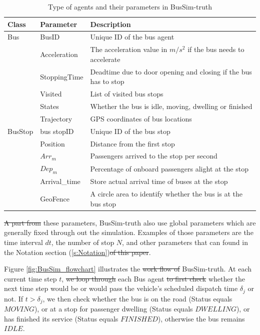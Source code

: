 \documentclass[11pt]{article}
\providecommand{\DIFaddtex}[1]{{\protect\color{blue}\uwave{#1}}} %
\providecommand{\DIFdeltex}[1]{{\protect\color{red}\sout{#1}}}                      %
\providecommand{\DIFaddbegin}{} %
\providecommand{\DIFaddend}{} %
\providecommand{\DIFdelbegin}{} %
\providecommand{\DIFdelend}{} %
\providecommand{\DIFadd}[1]{\texorpdfstring{\DIFaddtex{#1}}{#1}} %
\providecommand{\DIFdel}[1]{\texorpdfstring{\DIFdeltex{#1}}{}} %
\newcommand{\DIFscaledelfig}{0.5}
\newlength{\DIFdelgraphicswidth} %
\newlength{\DIFdelgraphicsheight} %
\newcommand{\DIFaddincludegraphics}[2][]{{\color{blue}\fbox{\DIFOincludegraphics[#1]{#2}}}} %
\newcommand{\DIFdelincludegraphics}[2][]{%
\sbox{\DIFdelgraphicsbox}{\DIFOincludegraphics[#1]{#2}}%
\settoboxwidth{\DIFdelgraphicswidth}{\DIFdelgraphicsbox} %
\settoboxtotalheight{\DIFdelgraphicsheight}{\DIFdelgraphicsbox} %
\scalebox{\DIFscaledelfig}{%
\parbox[b]{\DIFdelgraphicswidth}{\usebox{\DIFdelgraphicsbox}\\[-\baselineskip] \rule{\DIFdelgraphicswidth}{0em}}\llap{\resizebox{\DIFdelgraphicswidth}{\DIFdelgraphicsheight}{%
\setlength{\unitlength}{\DIFdelgraphicswidth}%
\begin{picture}(1,1)%
\thicklines\linethickness{2pt} %
{\color[rgb]{1,0,0}\put(0,0){\framebox(1,1){}}}%
{\color[rgb]{1,0,0}\put(0,0){\line( 1,1){1}}}%
{\color[rgb]{1,0,0}\put(0,1){\line(1,-1){1}}}%
\end{picture}%
}\hspace*{3pt}}} %
} %
\DeclareRobustCommand{\DIFaddbegin}{\DIFOaddbegin \let\includegraphics\DIFaddincludegraphics} %
\DeclareRobustCommand{\DIFaddend}{\DIFOaddend \let\includegraphics\DIFOincludegraphics} %
\DeclareRobustCommand{\DIFdelbegin}{\DIFOdelbegin \let\includegraphics\DIFdelincludegraphics} %
\DeclareRobustCommand{\DIFdelend}{\DIFOaddend \let\includegraphics\DIFOincludegraphics} %
\begin{document}
\DIFaddend \begin{table}[htbp]
  \centering
  \caption{Type of agents and their parameters in BusSim-truth}
    \begin{tabular}{rll}
    \toprule
    \multicolumn{1}{l}{\textbf{Class}} & \textbf{Parameter} & \textbf{Description} \\
    \midrule
    \multicolumn{1}{l}{Bus} & BusID  & Unique ID of the bus agent \\
          & Acceleration & The acceleration value in $m/s^2$ if the bus needs to accelerate \\
          & StoppingTime & Deadtime due to door opening and closing if the bus has to stop \\
          & Visited & List of visited bus stops \\
          & States & Whether the bus is idle, moving, dwelling or finished \\
          & Trajectory & GPS coordinates of bus locations \\
    \midrule
    \multicolumn{1}{l}{BusStop} & bus stopID & Unique ID of the bus stop \\
          & Position & Distance from the first stop \\
          & $Arr_m$ & Passengers arrived to the stop per second \\
          & $Dep_m$ & Percentage of onboard passengers alight at the stop \\
          & Arrival\_time & Store actual arrival time of buses at the stop \\
          & GeoFence & A circle area to identify whether the bus is at the bus stop \\
    \bottomrule
    \end{tabular}%
  \label{tab:Agents}%
\end{table}%

\DIFdelbegin \DIFdel{A part from }\DIFdelend \DIFaddbegin \DIFadd{In addition to }\DIFaddend these parameters, BusSim-truth also use global parameters which are generally fixed through out the simulation. Examples of those parameters are the time interval $dt$, the number of stop $N$, and other parameters that can found in the Notation section (\ref{s:Notation})\DIFdelbegin \DIFdel{of this paper}\DIFdelend .

Figure \ref{fig:BusSim_flowchart} illustrates the \DIFdelbegin \DIFdel{work flow of }\DIFdelend \DIFaddbegin \DIFadd{workflow for }\DIFaddend BusSim-truth. At each current time step $t$, \DIFdelbegin \DIFdel{we loop through }\DIFdelend each Bus agent \DIFdelbegin \DIFdel{to first check }\DIFdelend \DIFaddbegin \DIFadd{checks }\DIFaddend whether the next time step would be or would pass \DIFaddbegin {} \DIFaddend the vehicle's scheduled dispatch time $\delta_j$ or not. If $t>\delta_j$, we then check whether the bus is on the road (Status equals $MOVING$), or at a stop for passenger dwelling (Status equals $DWELLING$), or has finished its service (Status equals $FINISHED$), otherwise the bus remains $IDLE$. 
\end{document}
